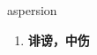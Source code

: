 
\begin{frame}
{\huge aspersion}
\begin{center}
\begin{enumerate}\Large
  \item \textbf{诽谤，中伤}
\end{enumerate}
\end{center}
\end{frame}

